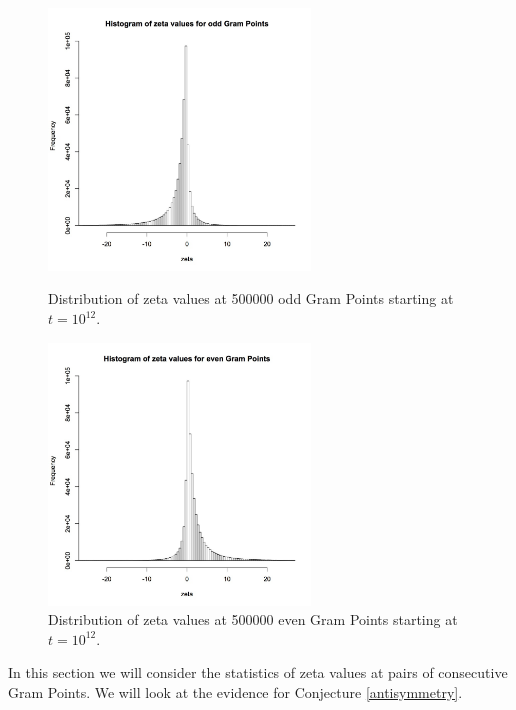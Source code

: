 \documentclass[twoside]{article}
\begin{document}
\begin{figure}
\centering
\includegraphics[width=0.62\textwidth]{ozeta.jpg}
\caption[]{ 
  Distribution of zeta values at 500000 odd Gram Points starting at $t = 10^{12}$.
 }
\vspace{1mm}
\label{oddhist}

\includegraphics[width=0.62\textwidth]{ezeta.jpg}
\caption[]{ 
   Distribution of zeta values at 500000 even Gram Points starting at $t = 10^{12}$.
 }
\label{evenhist}
\vspace{1mm}
\end{figure}

In this section we will consider the statistics of zeta values at pairs of consecutive Gram Points. We will look at the evidence for Conjecture \ref{antisymmetry}. 
\end{document}
